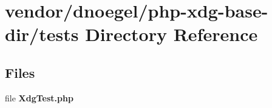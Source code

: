 \section{vendor/dnoegel/php-\/xdg-\/base-\/dir/tests Directory Reference}
\label{dir_2ecbb23be804662dab9ba7258687c8df}
\subsection*{Files}
\begin{DoxyCompactItemize}
\item 
file {\bf Xdg\+Test.\+php}
\end{DoxyCompactItemize}
